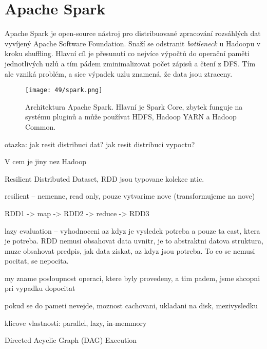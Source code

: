 
\section{Apache Spark}

Apache Spark je open-source nástroj pro distribuované zpracování rozsáhlých dat vyvíjený Apache Software Foundation. Snaží se odstranit \textit{bottleneck} u Hadoopu v kroku shuffling. Hlavní cíl je přesunutí co nejvíce výpočtů do operační paměti jednotlivých uzlů a tím pádem zminimalizovat počet zápisů a čtení z DFS. Tím ale vzniká problém, a sice výpadek uzlu znamená, že data jsou ztraceny.

\begin{figure}[H]
    \centering
    \texttt{[image: 49/spark.png]}
    \caption{Architektura Apache Spark. Hlavní je Spark Core, zbytek funguje na systému pluginů a může používat HDFS, Hadoop YARN a Hadoop Common.}
\end{figure}


otazka: jak resit distribuci dat? jak resit distribuci vypoctu?

V cem je jiny nez Hadoop

Resilient Distributed Dataset, RDD jsou typovane kolekce ntic.

resilient -- nemenne, read only, pouze vytvarime nove (transformujeme na nove)

RDD1 -> map -> RDD2 -> reduce -> RDD3

lazy evaluation -- vyhodnoceni az kdyz je vysledek potreba a pouze ta cast, ktera je potreba. RDD nemusi obsahovat data uvnitr, je to abstraktni datova struktura, muze obsahovat predpis, jak data ziskat, az kdyz jsou potreba. To co se nemusi pocitat, se nepocita.

my zname posloupnost operaci, ktere byly provedeny, a tim padem, jsme shcopni pri vypadku dopocitat

pokud se do pameti nevejde, moznost cachovani, ukladani na disk, mezivysledku

klicove vlastnosti: parallel, lazy, in-memmory

Directed Acyclic Graph (DAG) Execution
